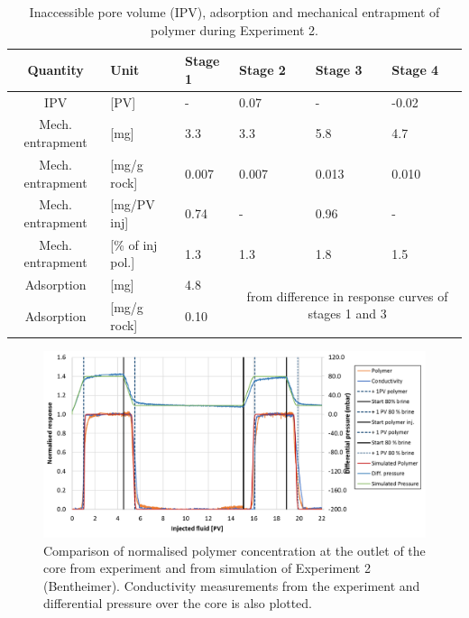\documentclass[journal = enfuem, manuscript =  article]{achemso}
\begin{document}
\begin{table} 
\small
\centering
\caption{Inaccessible pore volume (IPV), adsorption and mechanical entrapment of polymer during Experiment 2.}
\label{tab:ipvexp2}
\begin{tabular}{c l l l l l } 
\toprule
\textbf{Quantity} & \textbf{Unit} & \textbf{Stage 1} & \textbf{Stage 2} & \textbf{Stage 3} & \textbf{Stage 4} \\ 
\midrule 
IPV                & [PV]           & -         & 0.07     & -         & -0.02     \\
Mech. entrapment   & [mg]          & 3.3       & 3.3       & 5.8       & 4.7       \\ 
Mech. entrapment   & [mg/g rock]   & 0.007     & 0.007     & 0.013     & 0.010     \\ 
Mech. entrapment   & [mg/PV inj]   & 0.74      & -         & 0.96      & -         \\
Mech. entrapment   & [\% of inj pol.]& 1.3       & 1.3       & 1.8       & 1.5       \\ 
Adsorption         & [mg]          & 4.8       &   \multicolumn{3}{c}{\multirow{2}{15em}{from difference in response curves of stages 1 and 3}}        \\
Adsorption         & [mg/g rock]   & 0.10      &  \multicolumn{3}{c}{}    \\ 
\bottomrule
\end{tabular}
\end{table}

\begin{figure}[h]
    \centering
    \includegraphics[width=\textwidth]{fig/simExpNP2.png}
    \caption{Comparison of normalised polymer concentration at the outlet of the core from experiment and from simulation of Experiment 2 (Bentheimer). Conductivity measurements from the experiment and differential pressure over the core is also plotted.}
    \label{cht:simExpNP2}
\end{figure}
\end{document}
